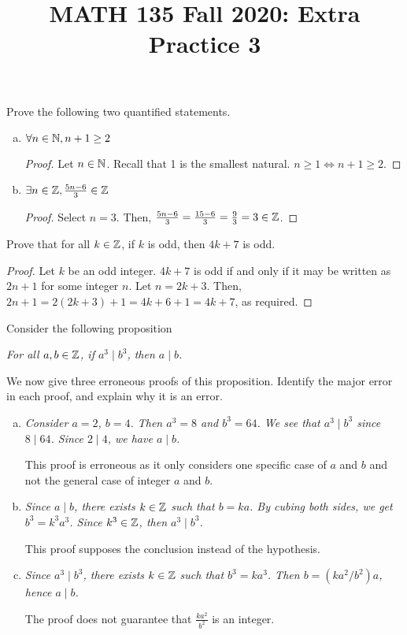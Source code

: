 
\title{MATH 135 Fall 2020: Extra Practice 3}


\thispagestyle{firstpage}

\textbf{\@title}


\question Prove the following two quantified statements.
\begin{enumerate}[(a)]
  \item $\forall n \in \mathbb{N}, n+1 \geq 2$
        \begin{proof}
          Let $n \in \mathbb{N}$.
          Recall that 1 is the smallest natural.
          $n \geq 1 \iff n+1 \geq 2$.
        \end{proof}

  \item $\exists n \in \mathbb{Z}, \frac{5n-6}{3} \in \mathbb{Z}$
        \begin{proof}
          Select $n=3$. Then, $\frac{5n-6}{3}=\frac{15-6}{3}=\frac{9}{3}=3 \in \mathbb{Z}$.
        \end{proof}
\end{enumerate}


\question Prove that for all $k \in \mathbb{Z}$, if $k$ is odd, then $4k + 7$ is odd.
\begin{proof}
  Let $k$ be an odd integer.
  $4k+7$ is odd if and only if it may be written as $2n+1$ for some integer $n$.
  Let $n=2k+3$.
  Then, $2n+1=2(2k+3)+1=4k+6+1=4k+7$, as required.
\end{proof}


\question Consider the following proposition
\begin{center}
  \emph{For all $a,b\in\mathbb{Z}$, if $a^3 \mid b^3$, then $a \mid b$.}
\end{center}
We now give three erroneous proofs of this proposition. Identify the major error in each proof, and explain why it is an error.
\begin{enumerate}[(a)]
  \item \emph{Consider $a = 2$, $b = 4$. Then $a^3 = 8$ and $b^3 = 64$. We see that $a^3 \mid b^3$ since $8 \mid 64$. Since $2 \mid 4$, we have $a \mid b$.}

        This proof is erroneous as it only considers one specific case of $a$ and $b$ and not the general case of integer $a$ and $b$.

  \item \emph{Since $a \mid b$, there exists $k\in\mathbb{Z}$ such that $b=ka$. By cubing both sides, we get $b^3 = k^3a^3$. Since $k^3\in\mathbb{Z}$, then $a^3\mid b^3$.}

        This proof supposes the conclusion instead of the hypothesis.

  \item \emph{Since $a^3 \mid b^3$, there exists $k\in\mathbb{Z}$ such that $b^3=ka^3$. Then $b=(ka^2/b^2)a$, hence $a \mid b$.}

        The proof does not guarantee that $\frac{ka^2}{b^2}$ is an integer.
\end{enumerate}


